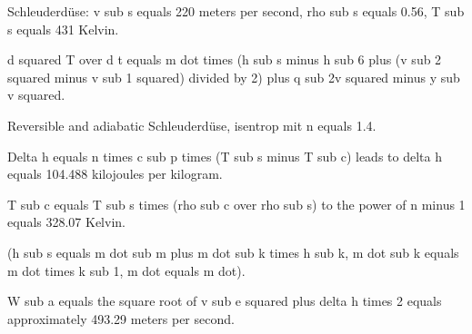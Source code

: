 Schleuderdüse: v sub s equals 220 meters per second, rho sub s equals 0.56, T sub s equals 431 Kelvin.

d squared T over d t equals m dot times (h sub s minus h sub 6 plus (v sub 2 squared minus v sub 1 squared) divided by 2) plus q sub 2v squared minus y sub v squared.

Reversible and adiabatic Schleuderdüse, isentrop mit n equals 1.4.

Delta h equals n times c sub p times (T sub s minus T sub c) leads to delta h equals 104.488 kilojoules per kilogram.

T sub c equals T sub s times (rho sub c over rho sub s) to the power of n minus 1 equals 328.07 Kelvin.

(h sub s equals m dot sub m plus m dot sub k times h sub k, m dot sub k equals m dot times k sub 1, m dot equals m dot).

W sub a equals the square root of v sub e squared plus delta h times 2 equals approximately 493.29 meters per second.
